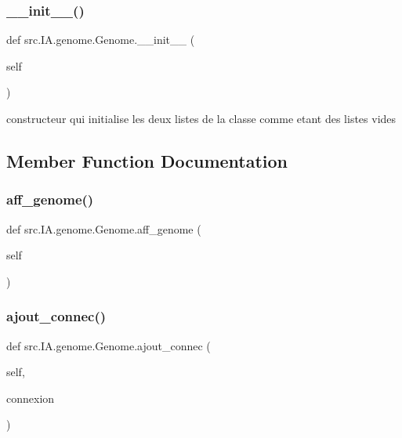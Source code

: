 \subsubsection{\texorpdfstring{\+\_\+\+\_\+init\+\_\+\+\_\+()}{\_\_init\_\_()}}
{\footnotesize\ttfamily def src.\+I\+A.\+genome.\+Genome.\+\_\+\+\_\+init\+\_\+\+\_\+ (\begin{DoxyParamCaption}\item[{}]{self }\end{DoxyParamCaption})}



constructeur qui initialise les deux listes de la classe comme etant des listes vides 



\subsection{Member Function Documentation}
\mbox{\label{classsrc_1_1_i_a_1_1genome_1_1_genome_ae5bfcd0f717f5aa7ac272aacdeb1a95d}} 
\subsubsection{\texorpdfstring{aff\+\_\+genome()}{aff\_genome()}}
{\footnotesize\ttfamily def src.\+I\+A.\+genome.\+Genome.\+aff\+\_\+genome (\begin{DoxyParamCaption}\item[{}]{self }\end{DoxyParamCaption})}

\mbox{\label{classsrc_1_1_i_a_1_1genome_1_1_genome_ad69b8deb3d375fd6a7ed59d5af580e5c}} 
\subsubsection{\texorpdfstring{ajout\+\_\+connec()}{ajout\_connec()}}
{\footnotesize\ttfamily def src.\+I\+A.\+genome.\+Genome.\+ajout\+\_\+connec (\begin{DoxyParamCaption}\item[{}]{self,  }\item[{}]{connexion }\end{DoxyParamCaption})}



